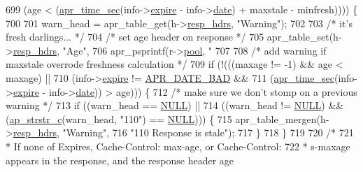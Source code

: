 \begin{DoxyCode}
{699          (age < (\hyperlink{group__apr__time_gae0237f70a9a3206b5263c0a474219476}{apr\_time\_sec}(info->\hyperlink{structcache__info_acad1125058221e40207cc515f294d474}{expire} - info->\hyperlink{structcache__info_a25cd61e421d08b30595f6373d230f95f}{date}) + maxstale - minfresh)))) \{
700 
701         warn\_head = apr\_table\_get(h->\hyperlink{structcache__handle_a66c4c1875bb9740d34ddda4d3e71065e}{resp\_hdrs}, \textcolor{stringliteral}{"Warning"});
702 
703         \textcolor{comment}{/* it's fresh darlings... */}
704         \textcolor{comment}{/* set age header on response */}
705         apr\_table\_set(h->\hyperlink{structcache__handle_a66c4c1875bb9740d34ddda4d3e71065e}{resp\_hdrs}, \textcolor{stringliteral}{"Age"},
706                       apr\_psprintf(r->\hyperlink{structrequest__rec_aa0a0c16f9a9ab3901cdb3f3c9c9d83d0}{pool}, \textcolor{stringliteral}{"%
707 
708         \textcolor{comment}{/* add warning if maxstale overrode freshness calculation */}
709         \textcolor{keywordflow}{if} (!(((maxage != -1) && age < maxage) ||
710               (info->\hyperlink{structcache__info_acad1125058221e40207cc515f294d474}{expire} != \hyperlink{group__APR__Util__Date_ga8be88b25f4b477ad13c4067c959411b0}{APR\_DATE\_BAD} &&
711                (\hyperlink{group__apr__time_gae0237f70a9a3206b5263c0a474219476}{apr\_time\_sec}(info->\hyperlink{structcache__info_acad1125058221e40207cc515f294d474}{expire} - info->\hyperlink{structcache__info_a25cd61e421d08b30595f6373d230f95f}{date})) > age))) \{
712             \textcolor{comment}{/* make sure we don't stomp on a previous warning */}
713             \textcolor{keywordflow}{if} ((warn\_head == \hyperlink{pcre_8txt_ad7f989d16aa8ca809a36bc392c07fba1}{NULL}) ||
714                 ((warn\_head != \hyperlink{pcre_8txt_ad7f989d16aa8ca809a36bc392c07fba1}{NULL}) && (\hyperlink{group__APACHE__CORE__DAEMON_ga48f6ba4ea178ad3a334403ec7206d7a3}{ap\_strstr\_c}(warn\_head, \textcolor{stringliteral}{"110"}) == 
      \hyperlink{pcre_8txt_ad7f989d16aa8ca809a36bc392c07fba1}{NULL}))) \{
715                 apr\_table\_mergen(h->\hyperlink{structcache__handle_a66c4c1875bb9740d34ddda4d3e71065e}{resp\_hdrs}, \textcolor{stringliteral}{"Warning"},
716                                  \textcolor{stringliteral}{"110 Response is stale"});
717             \}
718         \}
719 
720         \textcolor{comment}{/*}
721 \textcolor{comment}{         * If none of Expires, Cache-Control: max-age, or Cache-Control:}
722 \textcolor{comment}{         * s-maxage appears in the response, and the response header age}
}}
\end{DoxyCode}
